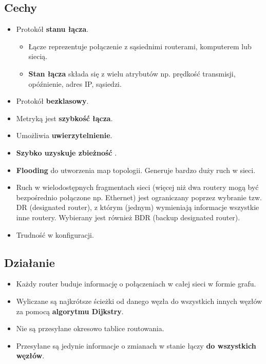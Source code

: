 \documentclass[../sk-egzamin.tex]{subfiles}
\begin{document}

\subsection*{Cechy}
\begin{itemize}
    \item Protokół \textbf{stanu łącza}.
    \begin{itemize}
        \item Łącze reprezentuje połączenie z sąsiednimi routerami, komputerem
        lub siecią.

        \item \textbf{Stan łącza} składa się z wielu atrybutów np.
        prędkość transmisji, opóźnienie, adres IP, sąsiedzi.
    \end{itemize}

    \item Protokół \textbf{bezklasowy}.
    \item Metryką jest \textbf{szybkość łącza}.
    \item Umożliwia \textbf{uwierzytelnienie}.
    \item \textbf{Szybko uzyskuje zbieżność} .
    \item \textbf{Flooding} do utworzenia map topologii.
    Generuje bardzo duży ruch w sieci.
    \item Ruch w wielodostępnych fragmentach sieci
    (więcej niż dwa routery mogą być bezpośrednio połączone np. Ethernet)
    jest ograniczany poprzez wybranie tzw. DR (designated router), z którym
    (jednym) wymieniają informacje wszystkie inne routery.
    Wybierany jest również BDR (backup designated router).
    \item Trudność w konfiguracji.
\end{itemize}

\subsection*{Działanie}
\begin{itemize}
    \item Każdy router buduje informację o połączeniach w całej sieci
     w formie grafu.
    \item Wyliczane są najkrótsze ścieżki od danego węzła do wszystkich innych
    węzłów za pomocą \textbf{algorytmu Dijkstry}.
    \item Nie są przesyłane okresowo tablice routowania.
    \item Przesyłane są jedynie informacje o zmianach w stanie łączy
    \textbf{do wszystkich węzłów}.
\end{itemize}
\end{document}
